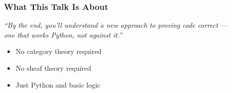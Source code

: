 
\begin{frame}[plain]
\maketitle
\end{frame}

\begin{frame}
\frametitle{What This Talk Is About}
\begin{center}
\Large
\textit{``By the end, you'll understand a new approach to proving code correct ---\\[6pt]
one that works  Python, not against it.''}
\end{center}
\vfill
\begin{itemize}
  \item No category theory required
  \item No sheaf theory required
  \item Just Python and basic logic
\end{itemize}
\end{frame}


